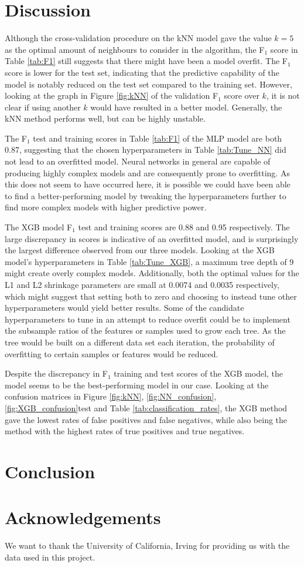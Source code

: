\documentclass[a4paper, 11pt, twocolumn]{article}
\begin{document}
\section{Discussion}
Although the cross-validation procedure on the kNN model gave the value $k=5$ as 
the optimal amount of neighbours to consider in the algorithm, the F$_1$ score 
in Table \ref{tab:F1} still suggests that there might have been a model overfit. 
The F$_1$ score is lower for the test set, indicating that the predictive 
capability of the model is notably reduced on the test set compared to the 
training set. However, looking at the graph in Figure \ref{fig:kNN} of the 
validation F$_1$ score over $k$, it is not clear if using another $k$ would have 
resulted in a better model. Generally, the kNN method performs well, but can be 
highly unstable. 

The F$_1$ test and training scores in Table \ref{tab:F1} of the MLP model are 
both 0.87, suggesting that the chosen hyperparameters in Table 
\ref{tab:Tune_NN} did not lead to an overfitted model. Neural networks in 
general are capable of producing highly complex models and are consequently 
prone to overfitting. As this does not seem to have occurred here, it is possible 
we could have been able to find a better-performing model by tweaking the 
hyperparameters further to find more complex models with higher predictive 
power. 

The XGB model F$_1$ test and training scores are 0.88 and 0.95 respectively. 
The large discrepancy in scores is indicative of an overfitted model, and is 
surprisingly the largest difference observed from our three models. Looking at 
the XGB model's hyperparameters in Table \ref{tab:Tune_XGB}, a maximum tree 
depth of 9 might create overly complex models. Additionally, both the optimal 
values for the L1 and L2 shrinkage parameters are small at 0.0074 and 0.0035 
respectively, which might suggest that setting both to zero and choosing to 
instead tune other hyperparameters would yield better results. Some of the 
candidate hyperparameters to tune in an attempt to reduce overfit could be to 
implement the subsample ratios of the features or samples used to grow each 
tree. As the tree would be built on a different data set each iteration, the 
probability of overfitting to certain samples or features would be reduced. 

Despite the discrepancy in F$_1$ training and test scores of the XGB model, the 
model seems to be the best-performing model in our case. Looking at the 
confusion matrices in Figure \ref{fig:kNN}, \ref{fig:NN_confusion}, 
\ref{fig:XGB_confusion}test and Table \ref{tab:classification_rates}, the XGB 
method gave the lowest rates of false positives and false negatives, while also 
being the method with the highest rates of true positives and true negatives. 

\section{Conclusion}


\section*{Acknowledgements}
We want to thank the University of California, Irving for providing us with the
data used in this project.


%

\end{document}
